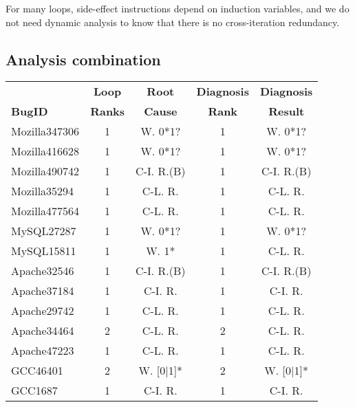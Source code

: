 For many loops, side-effect instructions depend on induction variables, 
and we do not need dynamic analysis to know that there is no cross-iteration redundancy.   


\subsection{Analysis combination}

\begin{table}
  \centering
  \small
  \newcommand{\Yes}[1]{\checkmark{}$_#1$}
  \newcommand{\No}[0]{-}
  \begin{tabular}{lcccc}
    \toprule
                    &{\bf Loop }   & {\bf Root}   & {\bf Diagnosis} & {\bf Diagnosis} \\
   {\bf BugID}      & {\bf Ranks}    & {\bf Cause}  & {\bf Rank }    & {\bf Result }   \\
   \midrule
   Mozilla347306    & 1            &  W. 0*1?     & 1             &  W. 0*1? \\
   Mozilla416628    & 1            &  W. 0*1?     & 1             &  W. 0*1?\\
   Mozilla490742    & 1            &  C-I. R.(B)  & 1             &  C-I. R.(B)\\
   Mozilla35294     & 1            &  C-L. R.     & 1             &  C-L. R.   \\ 
   Mozilla477564    & 1            &  C-L. R.     & 1             &  C-L. R.   \\
   \midrule 
   MySQL27287       & 1            &  W. 0*1?     & 1             &  W. 0*1? \\
   MySQL15811       & 1            &  W. 1*       & 1             &  C-L. R.\\ 
   \midrule    
   Apache32546      & 1            &  C-I. R.(B)  & 1             &  C-I. R.(B)\\
   Apache37184      & 1            &  C-I. R.     & 1             &  C-I. R.\\
   Apache29742      & 1            &  C-L. R.     & 1            &  C-L. R. \\ 
   Apache34464      & 2            &  C-L. R.     & 2            &  C-L. R.\\
   Apache47223      & 1            &  C-L. R.     & 1            &  C-L. R.\\
   \midrule
   GCC46401         & 2              &  W. [0$|$1]* & 2              &  W. [0$|$1]*  \\
   GCC1687          & 1              &  C-I. R.    & 1              &  C-I. R.\\

\end{tabular}
\end{table}
